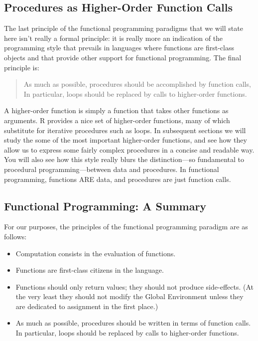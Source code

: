 \documentclass[]{book}
\providecommand{\tightlist}{%
  \setlength{\itemsep}{0pt}\setlength{\parskip}{0pt}}
\theoremstyle{definition}
\theoremstyle{definition}
\theoremstyle{remark}
\begin{document}
{\subsection{Procedures as Higher-Order Function
Calls}\label{procedures-as-higher-order-function-calls}

The last principle of the functional programming paradigms that we will
state here isn't really a formal principle: it is really more an
indication of the programming style that prevails in languages where
functions are first-class objects and that provide other support for
functional programming. The final principle is:

\begin{quote}
As much as possible, procedures should be accomplished by function
calls, In particular, loops should be replaced by calls to higher-order
functions.
\end{quote}

A higher-order function is simply a function that takes other functions
as arguments. R provides a nice set of
higher-order functions, many of which substitute for iterative
procedures such as loops. In subsequent sections we will study the some
of the most important higher-order functions, and see how they allow us
to express some fairly complex procedures in a concise and readable way.
You will also see how this style really blurs the distinction---so
fundamental to procedural programming---between data and procedures. In
functional programming, functions ARE data, and procedures are just
function calls.

\subsection{Functional Programming: A
Summary}\label{functional-programming-a-summary}

For our purposes, the principles of the functional programming paradigm
are as follows:

\begin{itemize}
\tightlist
\item
  Computation consists in the evaluation of functions.
\item
  Functions are first-class citizens in the language.
\item
  Functions should only return values; they should not produce
  side-effects. (At the very least they should not modify the Global
  Environment unless they are dedicated to assignment in the first
  place.)
\item
  As much as possible, procedures should be written in terms of function
  calls. In particular, loops should be replaced by calls to
  higher-order functions.
\end{itemize}

}
\end{document}
